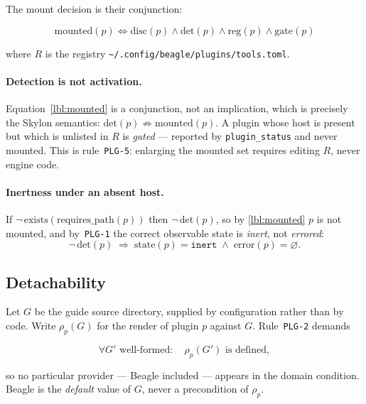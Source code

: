 \documentclass[11pt]{article}
\begin{document}
The mount decision is their conjunction:

\begin{equation}
  \boxed{\;\mathrm{mounted}(p) \iff
    \mathrm{disc}(p) \wedge \mathrm{det}(p) \wedge \mathrm{reg}(p) \wedge \mathrm{gate}(p)\;}
  \label{lbl:mounted}
\end{equation}

\noindent
where $R$ is the registry \texttt{\textasciitilde/.config/beagle/plugins/tools.toml}.

\paragraph{Detection is not activation.}
Equation~\eqref{lbl:mounted} is a conjunction, not an implication, which is precisely
the Skylon semantics: $\mathrm{det}(p) \not\Rightarrow \mathrm{mounted}(p)$. A plugin whose
host is present but which is unlisted in $R$ is \emph{gated} --- reported by
\texttt{plugin\_status} and never mounted. This is rule~\texttt{PLG-5}: enlarging the
mounted set requires editing $R$, never engine code.

\paragraph{Inertness under an absent host.}
If $\neg\,\mathrm{exists}(\mathrm{requires\_path}(p))$ then $\neg\,\mathrm{det}(p)$, so by
\eqref{lbl:mounted} $p$ is not mounted, and by~\texttt{PLG-1} the correct observable state
is \emph{inert}, not \emph{errored}:
\begin{equation}
  \neg\,\mathrm{det}(p) \;\Rightarrow\; \mathrm{state}(p) = \texttt{inert}
  \;\wedge\; \mathrm{error}(p) = \varnothing .
  \label{lbl:inert}
\end{equation}

\subsection{Detachability}

Let $G$ be the guide source directory, supplied by configuration rather than by code.
Write $\rho_{p}(G)$ for the render of plugin $p$ against $G$. Rule~\texttt{PLG-2} demands

\begin{equation}
  \forall G' \text{ well-formed}: \quad \rho_{p}(G') \text{ is defined},
  \label{lbl:detach}
\end{equation}

so no particular provider --- Beagle included --- appears in the domain condition.
Beagle is the \emph{default} value of $G$, never a precondition of $\rho_p$.
\end{document}
